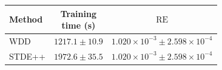 \begin{tabular}{@{}lcc@{}}
    \toprule
    Method & \shortstack{Training\\time (s)} & $\operatorname{RE}$ \\
    \midrule
    WDD & $1217.1 \pm 10.9$ & $1.020 \times 10^{-3} \pm 2.598 \times 10^{-4}$ \\
    STDE++ & $1972.6 \pm 35.5$ & $1.020 \times 10^{-3} \pm 2.598 \times 10^{-4}$ \\
    \bottomrule
\end{tabular}
